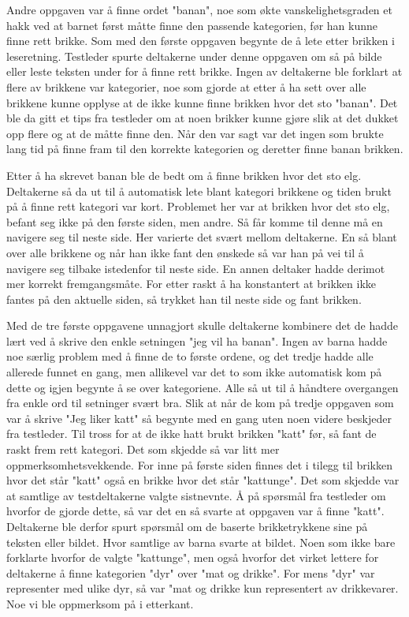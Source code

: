 Andre oppgaven var å finne ordet "banan", noe som økte vanskelighetsgraden et hakk ved at barnet først måtte finne den passende kategorien, før han kunne finne rett brikke. Som med den første oppgaven begynte de å lete etter brikken i leseretning. Testleder spurte deltakerne under denne oppgaven om så på bilde eller leste teksten under for å finne rett brikke. Ingen av deltakerne ble forklart at flere av brikkene var kategorier, noe som gjorde at etter å ha sett over alle brikkene kunne opplyse at de ikke kunne finne brikken hvor det sto "banan".
Det ble da gitt et tips fra testleder om at noen brikker kunne gjøre slik at det dukket opp flere og at de måtte finne den. Når den var sagt var det ingen som brukte lang tid på finne fram til den korrekte kategorien og deretter finne banan brikken. 

Etter å ha skrevet banan ble de bedt om å finne brikken hvor det sto elg. Deltakerne så da ut til å automatisk lete blant kategori brikkene og tiden brukt på å finne rett kategori var kort. Problemet her var at brikken hvor det sto elg, befant seg ikke på den første siden, men andre. Så får komme til denne må en navigere seg til neste side. Her varierte det svært mellom deltakerne. En så blant over alle brikkene og når han ikke fant den ønskede så var han på vei til å navigere seg tilbake istedenfor til neste side. En annen deltaker hadde derimot mer korrekt fremgangsmåte. For etter raskt å ha konstantert at brikken ikke fantes på den aktuelle siden, så trykket han til neste side og fant brikken. 


Med de tre første oppgavene unnagjort skulle deltakerne kombinere det de hadde lært ved å skrive den enkle setningen "jeg vil ha banan". Ingen av barna hadde noe særlig problem med å finne de to første ordene,  og det tredje hadde alle allerede funnet en gang, men allikevel var det to som ikke automatisk kom på dette og igjen begynte å se over kategoriene. Alle så ut til å håndtere overgangen fra enkle ord til setninger svært bra. Slik at når de kom på tredje oppgaven som var å skrive "Jeg liker katt" så begynte med en gang uten noen videre beskjeder fra testleder. Til tross for at de ikke hatt brukt brikken "katt" før, så fant de raskt frem rett kategori. Det som skjedde så var litt mer oppmerksomhetsvekkende. For inne på første siden finnes det i tilegg til brikken hvor det står "katt" også en brikke hvor det står "kattunge". Det som skjedde var at samtlige av testdeltakerne valgte sistnevnte. Å på spørsmål fra testleder om hvorfor de gjorde dette, så var det en så svarte at oppgaven var å finne "katt". Deltakerne ble derfor spurt spørsmål om de baserte brikketrykkene sine på teksten eller bildet. Hvor samtlige av barna svarte at bildet. Noen som ikke bare forklarte hvorfor de valgte "kattunge", men også hvorfor det virket lettere for deltakerne å finne kategorien "dyr" over "mat og drikke". For mens "dyr" var representer med ulike dyr, så var "mat og drikke kun representert av drikkevarer. Noe vi ble oppmerksom på i etterkant.


